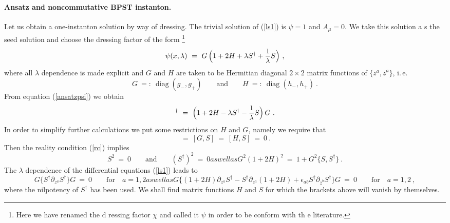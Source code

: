 \documentclass[a4paper,11pt,english]{article}
\numberwithin{equation}{section}
\newcommand{\diag}[1]{\operatorname{diag}(#1)}
\renewcommand{\=}{\ =\ }
\begin{document}
\paragraph{Ansatz and noncommutative BPST instanton.} 
Let us obtain a one-instanton solution by way of dressing. 
The trivial solution of 
(\ref{ls1}) is $\psi=1$ and ${A}_\mu=0$. We take this solution a%
s the seed solution and choose the dressing factor of the form \cite{
Belavin:cz}\footnote{ Here we have renamed the d%
ressing factor $\chi$ and called it $\psi$ in order to be conform with th%
e literature.}
\begin{equation}\label{ansatzpsi}
 \psi(x,\lambda) \= G\,\Bigl(1+2H+\lambda S^\dagger+\frac{1}{\lambda}S\Bigr)\ ,
\end{equation}
where all $\lambda$ dependence is made explicit and 
$G$ and $H$ are taken to be Hermitian diagonal $2{\times}2$ matrix
functions of $\{z^a,\bar{z}^a\}$, i.\,e.
\begin{equation} \label{diag}
G\ =:\ \diag{g_-,g_+} \qquad\text{and}\qquad H\ =:\ \diag{h_-,h_+}\ .
\end{equation}
{}From equation (\ref{ansatzpsi}) we obtain
\begin{equation}
 [\psi(x,-\bar{\lambda}^{-1})]^\dagger\=\Bigl(1+2H-\lambda S^\dagger-
\frac{1}{\lambda}S\Bigr)\,G\ .
\end{equation}
In order to simplify further calculations we put some restrictions on $H$ %
 and $G$, namely we require that 
\begin{equation}
[G,H]\=[G,S]\=[H,S]\=0\ .\label{commute} 
\end{equation}
Then the reality condition (\ref{rc}) implies
\begin{subequations}
\begin{equation}
 S^2\=0 \qquad\text{and}\qquad  (S^\dagger)^2\=0 \label{cog2}
\end{equation}
as well as
\begin{equation}
 G^2(1{+}2H)^2 \= 1+G^2\{S,S^\dagger\}\ . \label{cog}
\end{equation}
\end{subequations}
The $\lambda$ dependence of the differential equations (\ref{ls1}) leads to
\begin{subequations}
\begin{equation}
 G\bigl\{S^\dagger\partial_{z^a}S^\dagger\bigr\}G\=0
 \qquad\text{for}\quad a=1,2 \label{cpde}
\end{equation}
as well as
\begin{equation}
 G\bigl\{(1{+}2H)\partial_{z^a}S^\dagger-S^\dagger\partial_{z^a}(1{+}2H)
 +\epsilon_{ab}S^\dagger\partial_{\bar{z}^b}S^\dagger\bigr\}G\=0
 \qquad\text{for}\quad a=1,2\ ,\label{cpde2}
\end{equation}
\end{subequations}
where the nilpotency of $S^\dagger$ has been used.
We shall find matrix functions $H$ and $S$ for which the brackets above 
will vanish by themselves.
\end{document}
